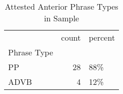 \begin{table}[htbp!]
\centering
\caption{Attested Anterior Phrase Types in Sample}
\label{table:ant_phtype_ct}
\begin{tabular}{lrl}
\toprule
{} &  count & percent \\
Phrase Type &        &         \\
\midrule
PP          &     28 &     88\% \\
ADVB        &      4 &     12\% \\
\bottomrule
\end{tabular}
\end{table}

